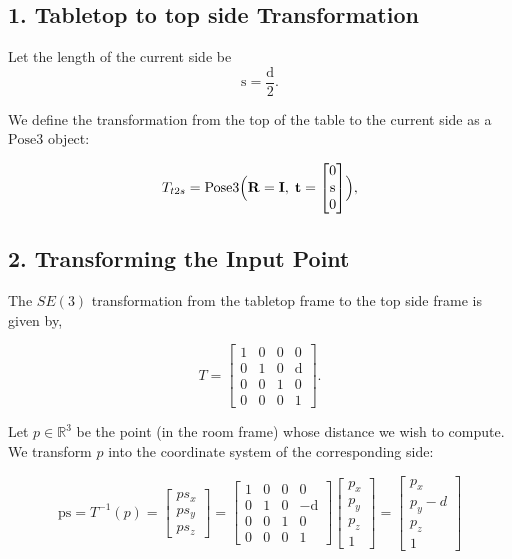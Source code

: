 \documentclass[11pt]{article}
\begin{document}
    \subsection*{1. Tabletop to top side Transformation}

    Let the length of the current side be
    \begin{equation}
        \text{s} = \frac{\text{d}}{2}.
    \end{equation}

    We define the transformation from the top of the table to the current side as a \(\text{Pose3}\) object:

    \begin{equation}
        T_{t2s} = \text{Pose3}\Bigl(\mathbf{R}=\mathbf{I},\; \mathbf{t} = \begin{bmatrix} 0 \\ \text{s} \\ 0 \end{bmatrix}\Bigr),
    \end{equation}

    \subsection*{2. Transforming the Input Point}

    The $SE(3)$ transformation from the tabletop frame to the top side frame is given by,

    \begin{equation}
        T = \begin{bmatrix} 1 & 0 & 0 & 0 \\ 0 & 1 & 0 & \text{d} \\ 0 & 0 & 1 & 0 \\ 0 & 0 & 0 & 1 \end{bmatrix}.
    \end{equation}

    Let \(p \in \mathbb{R}^3\) be the point (in the room frame) whose distance we wish to compute.
    We transform \(p\) into the coordinate system of the corresponding side:

    \begin{equation}
        \text{ps} = T^{-1}(p) = \begin{bmatrix} ps_x \\ ps_y \\ ps_z \end{bmatrix} = \begin{bmatrix} 1 & 0 & 0 & 0 \\ 0 & 1 & 0 & -\text{d} \\ 0 & 0 & 1 & 0 \\ 0 & 0 & 0 & 1 \end{bmatrix} \begin{bmatrix} p_x \\ p_y \\ p_z \\ 1 \end{bmatrix} = \begin{bmatrix} p_x \\ p_y - d \\ p_z \\ 1 \end{bmatrix}
    \end{equation}
\end{document}

